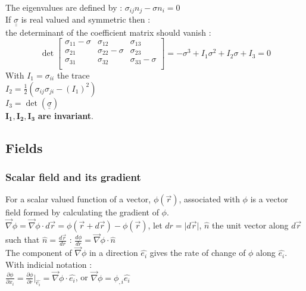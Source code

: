 \documentclass[../main.tex]{subfiles}
\begin{document}
The eigenvalues are defined by : $\sigma_{ij}n_j- \sigma n_i = 0 $\\
If $\underline{\underline{\sigma}}$ is real valued and symmetric then :\\
the determinant of the coefficient matrix should vanish :\\
\begin{equation}
    \det \begin{bmatrix}
    \sigma_{11}-\sigma & \sigma_{12} & \sigma_{13}\\
    \sigma_{21} &\sigma_{22}-\sigma & \sigma_{23}\\
    \sigma_{31} & \sigma_{32} & \sigma_{33}-\sigma\\
    \end{bmatrix} = -\sigma^3 + I_1 \sigma^2 + I_2 \sigma + I_3 = 0
\end{equation}
With $I_1 = \sigma_{ii}$ the trace\\
$I_2 = \frac{1}{2}(\sigma_{ij}\sigma_{ji} - (I_1)^2)$\\
$I_3 = \det(\underline{\underline{\sigma}})$\\

$\mathbf{I_1, I_2, I_3}$ \textbf{are invariant}.\\

\subsection{Fields}
\subsubsection{Scalar field and its gradient}
\quad For a scalar valued function of a vector, $\phi(\Vec{r})$, associated with $\phi$ is a vector field formed by calculating the gradient of $\phi$.\\
$\Vec{\nabla}\phi = \Vec{\nabla} \phi \cdot d\Vec{r} = \phi(\Vec{r}+d\Vec{r}) - \phi(\Vec{r})$, let $dr = \lvert d\Vec{r}\rvert$, $\hat{n}$ the unit vector along $d\Vec{r}$ such that $\hat{n} = \frac{d\Vec{r}}{dr}$ : $\frac{d\phi}{dr} = \Vec{\nabla} \phi \cdot \hat{n}$\\
The component of $\Vec{\nabla} \phi$ in a direction $\hat{e_i}$ gives the rate of change of $\phi$ along $\hat{e_i}$. With indicial notation :\\
$\frac{\partial \phi}{\partial x_i} = \frac{\partial \phi}{\partial r}\rvert_{\hat{e_i}} = \Vec{\nabla}\phi \cdot \hat{e_i}$, or $\Vec{\nabla} \phi = \phi_{,i} \hat{e_i}$\\
\end{document}
